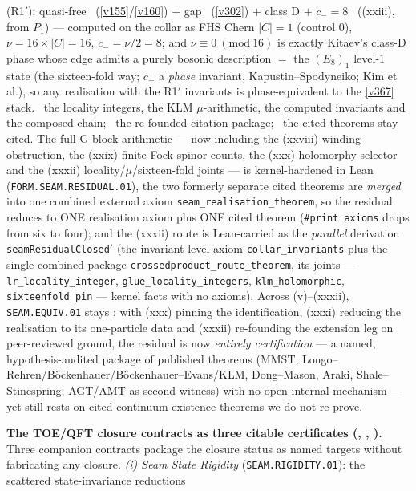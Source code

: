 \documentclass[11pt,a4paper]{article}
\begin{document}
\begin{keybox}
(R1$'$): quasi-free \mC\ (\vref{v155}/\vref{v160}) $+$ gap \mE\ (\vref{v302}) $+$ class D $+$ $c_-{=}8$ \mE\
((xxiii), from $P_1$) --- computed on the collar as FHS Chern $|C|{=}1$ (control $0$), $\nu{=}16{\times}|C|{=}16$,
$c_-{=}\nu/2{=}8$; and $\nu{\equiv}0\ (\mathrm{mod}\ 16)$ is exactly Kitaev's class-D phase whose edge admits a
purely bosonic description $=$ the $(E_8)_1$ level-$1$ state (the sixteen-fold way; $c_-$ a \emph{phase} invariant,
Kapustin--Spodyneiko; Kim et al.), so any realisation with the R1$'$ invariants is phase-equivalent to the
\vref{v367} stack. \mE\ the locality integers, the KLM $\mu$-arithmetic, the computed invariants and the composed
chain; \mC\ the re-founded citation package; \mO\ the cited theorems stay cited. The full G-block
arithmetic --- now including the (xxviii) winding obstruction, the (xxix) finite-Fock spinor counts, the (xxx)
holomorphy selector and the (xxxii) locality/$\mu$/sixteen-fold joints --- is kernel-hardened in Lean
(\texttt{FORM.SEAM.RESIDUAL.01}), the two formerly separate
cited theorems are \emph{merged} into one combined external axiom \texttt{seam\_realisation\_theorem}, so the residual
reduces to ONE realisation axiom plus ONE cited theorem (\texttt{\#print axioms} drops from six to four); and the
(xxxii) route is Lean-carried as the \emph{parallel} derivation \texttt{seamResidualClosed$'$} (the invariant-level
axiom \texttt{collar\_invariants} plus the single combined package \texttt{crossedproduct\_route\_theorem}, its
joints --- \texttt{lr\_locality\_integer}, \texttt{glue\_locality\_integers}, \texttt{klm\_holomorphic},
\texttt{sixteenfold\_pin} --- kernel facts with no axioms). Across
(v)--(xxxii), \texttt{SEAM.EQUIV.01}
stays \mO: with (xxx) pinning the identification, (xxxi) reducing the realisation to its one-particle data and
(xxxii) re-founding the extension leg on peer-reviewed ground, the
residual is now \emph{entirely certification} --- a named, hypothesis-audited package of published theorems (MMST,
Longo--Rehren/B\"ockenhauer/B\"ockenhauer--Evans/KLM, Dong--Mason, Araki, Shale--Stinespring; AGT/AMT as second
witness) with no open internal mechanism --- yet still rests on cited
continuum-existence theorems we do not re-prove.
\par\smallskip\noindent\textbf{The TOE/QFT closure contracts as three citable certificates
(\veri{v398\_seam\_state\_rigidity.py}, \veri{v399\_gravity\_complete.py}, ).}
Three companion contracts package the closure status as named targets without fabricating any closure.
\emph{(i) Seam State Rigidity} (\texttt{SEAM.RIGIDITY.01}): the scattered state-invariance reductions

\end{keybox}
\end{document}
